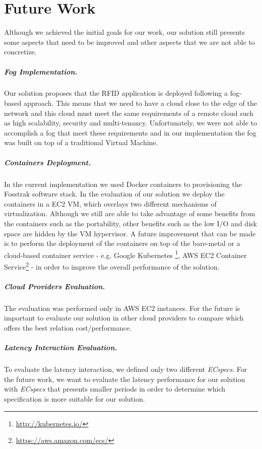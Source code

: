 \section{Future Work}
\label{sec:future_work}
Although we achieved the initial goals for our work, our solution still presents some aspects that
need to be improved and other aspects that we are not able to concretize.

\subparagraph{Fog Implementation.}
\label{subp:fog_impl}
Our solution proposes that the \gls{RFID} application is deployed following a fog-based approach.
This means that we need to have a cloud close to the edge of the network and this cloud must meet
the same requirements of a remote cloud such as high scalability, security and multi-tenancy.
Unfortunately, we were not able to accomplish a fog that meet these requirements and in our implementation
the fog was built on top of a traditional Virtual Machine.\\

\subparagraph{Containers Deployment.}
\label{subp:containers_impl}
In the current implementation we used Docker containers to provisioning the Fosstrak software stack.
In the evaluation of our solution we deploy the containers in a \gls{EC2} \gls{VM}, which overlays two
different mechanisms of virtualization. Although we still are able to take advantage of some benefits
from the containers such as the portability, other benefits such as the low I/O and disk space are
hidden by the \gls{VM} hypervisor. A future improvement that can be made is to perform the deployment
of the containers on top of the bare-metal or a cloud-based container service - e.g. Google Kubernetes
\footnote{\url{http://kubernetes.io/}}, \gls{AWS} \gls{EC2} Container Service\footnote{\url{https://aws.amazon.com/ecs/}} -
in order to improve the overall performance of the solution.

\subparagraph{Cloud Providers Evaluation.}
\label{subp:cloud_eval}
The evaluation was performed only in \gls{AWS} \gls{EC2} instances. For the future is important to
evaluate our solution in other cloud providers to compare which offers the best relation
cost/performance.\\

\subparagraph{Latency Interaction Evaluation.}
\label{subp:latency_eval}
To evaluate the latency interaction, we defined only two different \textit{ECspecs}. For the future work,
we want to evaluate the latency performance for our solution with \textit{ECspecs} that presents smaller
periods in order to determine which specification is more suitable for our solution.\\

